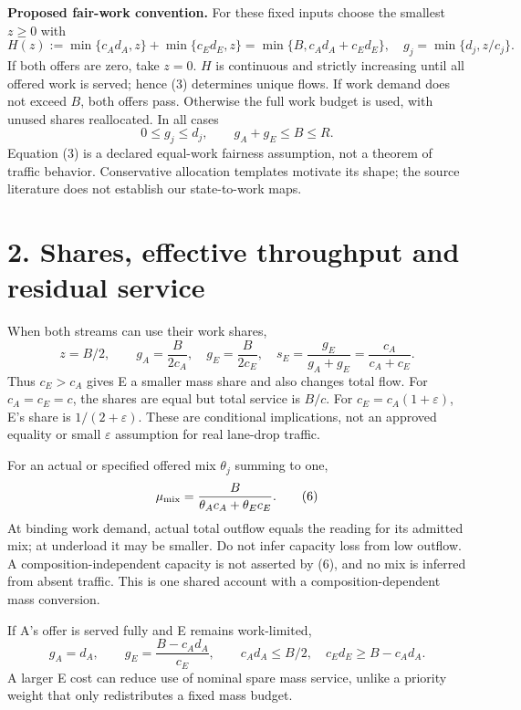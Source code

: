\documentclass[11pt,a4paper]{article}
\begin{document}
\textbf{Proposed fair-work convention.} For these fixed inputs choose the
smallest $z\geq0$ with
\begin{equation}
 H(z):=\min\{c_Ad_A,z\}+\min\{c_Ed_E,z\}
     =\min\{B,c_Ad_A+c_Ed_E\},\quad
 g_j=\min\{d_j,z/c_j\}. \tag{3}
\end{equation}
If both offers are zero, take $z=0$. $H$ is continuous and strictly
increasing until all offered work is served; hence (3) determines unique
flows. If work demand does not exceed $B$, both offers pass. Otherwise
the full work budget is used, with unused shares reallocated. In all cases
\begin{equation}
 0\leq g_j\leq d_j,\qquad g_A+g_E\leq B\leq R. \tag{4}
\end{equation}
Equation (3) is a declared equal-work fairness assumption, not a theorem
of traffic behavior. Conservative allocation templates motivate its shape;
the source literature does not establish our state-to-work maps.

\newpage
\section*{2. Shares, effective throughput and residual service}

When both streams can use their work shares,
\begin{equation}
 z=B/2,\qquad g_A=\frac{B}{2c_A},\quad g_E=\frac{B}{2c_E},\quad
 s_E=\frac{g_E}{g_A+g_E}=\frac{c_A}{c_A+c_E}. \tag{5}
\end{equation}
Thus $c_E>c_A$ gives E a smaller mass share and also changes total flow.
For $c_A=c_E=c$, the shares are equal but total service is $B/c$.
For $c_E=c_A(1+\varepsilon)$, E's share is $1/(2+\varepsilon)$.
These are conditional implications, not an approved equality or small
$\varepsilon$ assumption for real lane-drop traffic.

For an actual or specified offered mix $\theta_j$ summing to one,
\begin{equation}
 \mu_{\rm mix}=\frac{B}{\theta_Ac_A+\theta_Ec_E}. \tag{6}
\end{equation}
At binding work demand, actual total outflow equals the reading for its
admitted mix; at underload it may be smaller. Do not infer capacity loss
from low outflow. A composition-independent capacity is not asserted by
(6), and no mix is inferred from absent traffic. This is one shared
account with a composition-dependent mass conversion.

If A's offer is served fully and E remains work-limited,
\begin{equation}
 g_A=d_A,\qquad g_E=\frac{B-c_Ad_A}{c_E},\qquad
 c_Ad_A\leq B/2,\quad c_Ed_E\geq B-c_Ad_A. \tag{7}
\end{equation}
A larger E cost can reduce use of nominal spare mass service, unlike a
priority weight that only redistributes a fixed mass budget.
\end{document}
